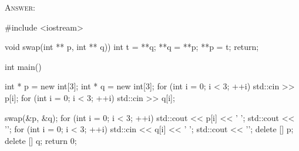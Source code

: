 \textsc{Answer:}\vspace{-2mm}
\begin{answercode}
#include <iostream>

void swap(int ** p, int ** q))
{
    int t = **q;
    **q = **p;
    **p = t;
    return;
}

int main()
{
    int * p = new int[3];
    int * q = new int[3];
    for (int i = 0; i < 3; ++i)
    {
        std::cin >> p[i];
    }
    for (int i = 0; i < 3; ++i)
    {
        std::cin >> q[i];
    }

    swap(&p, &q);
    for (int i = 0; i < 3; ++i)
    {
        std::cout << p[i] << ' ';
    }
    std::cout << '\n';
    for (int i = 0; i < 3; ++i)
    {
        std::cin << q[i] << ' ';
    }
    std::cout << '\n';
    delete [] p;
    delete [] q;
    return 0;
}
\end{answercode}

\newpage


